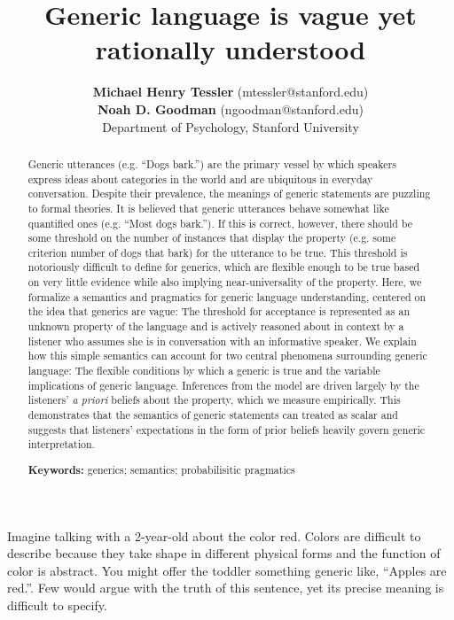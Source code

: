 \documentclass[10pt,letterpaper]{article}
\title{Generic language is vague yet rationally understood}
\author{{\large \bf Michael Henry Tessler} (mtessler@stanford.edu)\\ {\large \bf Noah D. Goodman} (ngoodman@stanford.edu) \\
  Department of Psychology, Stanford University}
\begin{document}
\maketitle


\begin{abstract}
Generic utterances (e.g. ``Dogs bark.'') are the primary vessel by which speakers express ideas about categories in the world and are ubiquitous in everyday conversation. 
Despite their prevalence, the meanings of generic statements are puzzling to formal theories. 
It is believed that generic utterances behave somewhat like quantified ones (e.g. ``Most dogs bark.''). 
If this is correct, however, there should be some threshold on the number of instances that display the property (e.g. some criterion number of dogs that bark) for the utterance to be true.
This threshold is notoriously difficult to define for generics, which are flexible enough to be true based on very little evidence while also implying near-universality of the property. 
Here, we formalize a semantics and pragmatics for generic language understanding, centered on the idea that generics are vague: The threshold for acceptance is represented as an unknown property of the language and is actively reasoned about in context by a listener who assumes she is in conversation with an informative speaker. 
We explain how this simple semantics can account for two central phenomena surrounding generic language: The flexible conditions by which a generic is true and the variable implications of generic language. 
Inferences from the model are driven largely by the listeners' \emph{a priori} beliefs about the property, which we measure empirically.
This demonstrates that the semantics of generic statements can treated as scalar and suggests that listeners' expectations in the form of prior beliefs heavily govern generic interpretation. 


\textbf{Keywords:} 
generics; semantics; probabilisitic pragmatics
\end{abstract}

Imagine talking with a 2-year-old about the color red.
Colors are difficult to describe because they take shape in different physical forms and the function of color is abstract.
You might offer the toddler something generic like, ``Apples are red.''. 
Few would argue with the truth of this sentence, yet its precise meaning is difficult to specify. 
\end{document}
